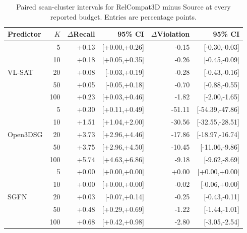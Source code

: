 \begin{table}[t]
\centering\small
\begin{tabular}{@{}lrrrrr@{}}
\toprule
Predictor & $K$ & $\Delta$Recall & 95\% CI & $\Delta$Violation & 95\% CI \\
\midrule
\multirow{5}{*}{VL-SAT} & 5 & +0.13 & [+0.00,+0.26] & -0.15 & [-0.30,-0.03] \\
 & 10 & +0.18 & [+0.05,+0.35] & -0.26 & [-0.45,-0.09] \\
 & 20 & +0.08 & [-0.03,+0.19] & -0.28 & [-0.43,-0.16] \\
 & 50 & +0.05 & [-0.05,+0.18] & -0.70 & [-0.88,-0.55] \\
 & 100 & +0.23 & [+0.03,+0.46] & -1.82 & [-2.00,-1.65] \\
\midrule
\multirow{5}{*}{Open3DSG} & 5 & +0.30 & [+0.11,+0.49] & -51.11 & [-54.39,-47.86] \\
 & 10 & +1.51 & [+1.04,+2.00] & -30.56 & [-32.55,-28.51] \\
 & 20 & +3.73 & [+2.96,+4.46] & -17.86 & [-18.97,-16.74] \\
 & 50 & +3.75 & [+2.96,+4.50] & -10.45 & [-11.06,-9.86] \\
 & 100 & +5.74 & [+4.63,+6.86] & -9.18 & [-9.62,-8.69] \\
\midrule
\multirow{5}{*}{SGFN} & 5 & +0.00 & [+0.00,+0.00] & +0.00 & [+0.00,+0.00] \\
 & 10 & +0.00 & [+0.00,+0.00] & -0.02 & [-0.06,+0.00] \\
 & 20 & +0.03 & [-0.07,+0.14] & -0.25 & [-0.43,-0.11] \\
 & 50 & +0.48 & [+0.29,+0.69] & -1.22 & [-1.44,-1.01] \\
 & 100 & +0.68 & [+0.42,+0.98] & -2.80 & [-3.05,-2.54] \\
\bottomrule
\end{tabular}
\caption{Paired scan-cluster intervals for RelCompat3D minus Source at every reported budget. Entries are percentage points.}
\label{tab:no-family-ci}
\end{table}
